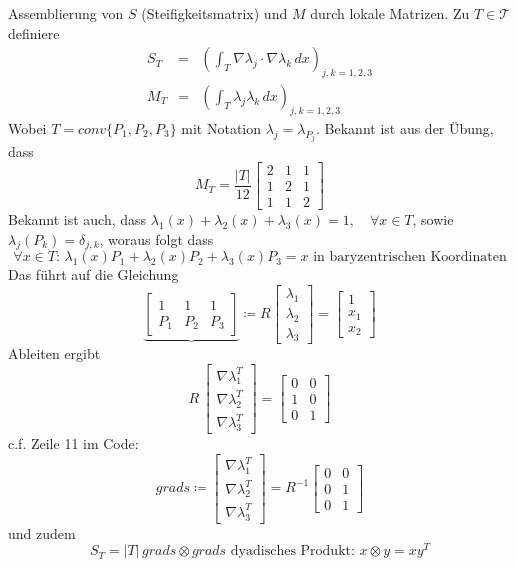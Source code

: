 \documentclass[a4paper]{amsart}
\begin{document}
Assemblierung von $S$ (Steifigkeitsmatrix) und $M$ durch lokale Matrizen. Zu $T\in\mathcal{T}$ definiere
\begin{eqnarray*}
		S_T &=& \left(\int_T\nabla\lambda_j\cdot\nabla\lambda_k\,dx\right)_{j,k = 1,2,3}\\
		M_T &=& \left(\int_T \lambda_j\lambda_k\,dx\right)_{j,k = 1,2,3}
\end{eqnarray*}
Wobei $T = conv\{P_1,P_2,P_3\}$ mit Notation $\lambda_j = \lambda_{P_j}$. Bekannt ist aus der Übung, dass
\[
	M_T = \frac{\vert T\vert}{12}\begin{bmatrix}2&1&1\\1&2&1\\1&1&2\end{bmatrix}
\]
Bekannt ist auch, dass $\lambda_1(x) + \lambda_2(x) + \lambda_3(x) = 1,\quad\forall x\in T$, sowie $\lambda_j(P_k) = \delta_{j,k}$, woraus folgt dass
\[
	\forall x\in T:\,\lambda_1(x)P_1 + \lambda_2(x)P_2 + \lambda_3(x)P_3 = x\text{ in baryzentrischen Koordinaten}
\]
Das führt auf die Gleichung
\[
	\underbrace{\begin{bmatrix} 1&1&1\\P_1&P_2&P_3\end{bmatrix}}{\coloneqq R}\begin{bmatrix}\lambda_1\\ \lambda_2\\ \lambda_3\end{bmatrix} = \begin{bmatrix} 1 \\ x_1 \\ x_2\end{bmatrix}
\]
Ableiten ergibt
\[
	R\,\begin{bmatrix}\nabla\lambda_1^T\\ \nabla\lambda_2^T\\ \nabla\lambda_3^T\end{bmatrix} = \begin{bmatrix} 0 & 0 \\ 1 & 0\\ 0 & 1 \end{bmatrix}
\]
c.f. Zeile 11 im Code:
\[
	grads\coloneqq\begin{bmatrix} \nabla\lambda_1^T\\ \nabla\lambda_2^T\\ \nabla\lambda_3^T\end{bmatrix} = R^{-1} \begin{bmatrix}0 & 0 \\ 0 & 1 \\ 0 & 1\end{bmatrix}
\]
und zudem
\[
	S_T = \vert T \vert\, grads \otimes grads\text{ dyadisches Produkt: }x\otimes y = xy^T
\]
\end{document}
